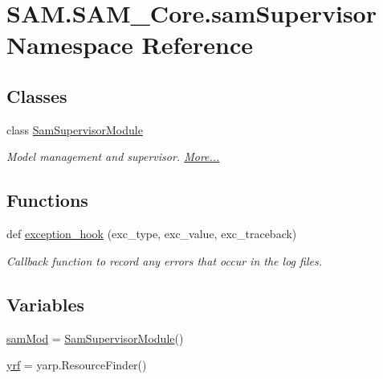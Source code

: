 \hypertarget{namespaceSAM_1_1SAM__Core_1_1samSupervisor}{}\section{S\+A\+M.\+S\+A\+M\+\_\+\+Core.\+sam\+Supervisor Namespace Reference}
\label{namespaceSAM_1_1SAM__Core_1_1samSupervisor}
\subsection*{Classes}
\begin{DoxyCompactItemize}
\item 
class \hyperlink{group__icubclient__SAM__Core_classSAM_1_1SAM__Core_1_1samSupervisor_1_1SamSupervisorModule}{Sam\+Supervisor\+Module}
\begin{DoxyCompactList}\small\item\em Model management and supervisor.  \hyperlink{group__icubclient__SAM__Core_classSAM_1_1SAM__Core_1_1samSupervisor_1_1SamSupervisorModule}{More...}\end{DoxyCompactList}\end{DoxyCompactItemize}
\subsection*{Functions}
\begin{DoxyCompactItemize}
\item 
def \hyperlink{namespaceSAM_1_1SAM__Core_1_1samSupervisor_a415b85af0bd12e418a319fecfd65e31f}{exception\+\_\+hook} (exc\+\_\+type, exc\+\_\+value, exc\+\_\+traceback)
\begin{DoxyCompactList}\small\item\em Callback function to record any errors that occur in the log files. \end{DoxyCompactList}\end{DoxyCompactItemize}
\subsection*{Variables}
\begin{DoxyCompactItemize}
\item 
\hyperlink{namespaceSAM_1_1SAM__Core_1_1samSupervisor_a998b816bed474dcb43905a36b489fd09}{sam\+Mod} = \hyperlink{group__icubclient__SAM__Core_classSAM_1_1SAM__Core_1_1samSupervisor_1_1SamSupervisorModule}{Sam\+Supervisor\+Module}()
\item 
\hyperlink{namespaceSAM_1_1SAM__Core_1_1samSupervisor_ade9e0fbf5ed13d1d191932931a4e3aac}{yrf} = yarp.\+Resource\+Finder()
\end{DoxyCompactItemize}


